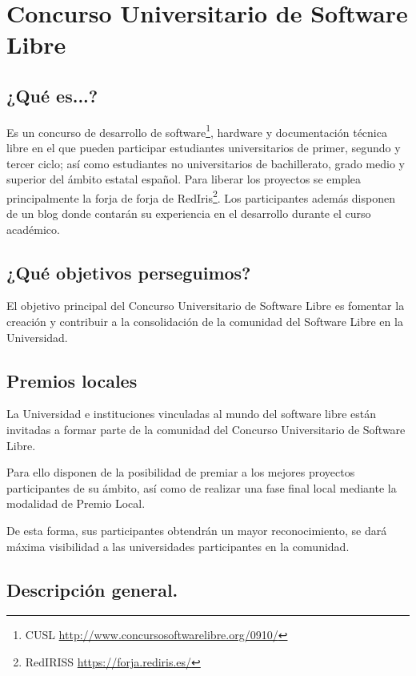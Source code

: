 \chapter*{Concurso Universitario de Software Libre} \label{ap2}

\vspace*{5mm}

\section*{¿Qué es...?}

Es un concurso de desarrollo de software\footnote{CUSL
\url{http://www.concursosoftwarelibre.org/0910/}}, hardware y documentación
técnica libre en el que pueden participar estudiantes universitarios de primer,
segundo y tercer ciclo; así como estudiantes no universitarios de bachillerato,
grado medio y superior del ámbito estatal español. Para liberar los proyectos se
emplea principalmente la forja de forja de RedIris\footnote{RedIRISS
\url{https://forja.rediris.es/}}. Los participantes además
disponen de un blog donde contarán su experiencia en el desarrollo durante el
curso académico.

\section*{¿Qué objetivos perseguimos?}

El objetivo principal del Concurso Universitario de Software Libre es fomentar
la creación y contribuir a la consolidación de la comunidad del Software Libre
en la Universidad.

\section*{Premios locales}

La Universidad e instituciones vinculadas al mundo del software libre están
invitadas a formar parte de la comunidad del Concurso Universitario de Software
Libre.

Para ello disponen de la posibilidad de premiar a los mejores proyectos
participantes de su ámbito, así como de realizar una fase final local mediante
la modalidad de Premio Local.

De esta forma, sus participantes obtendrán un mayor reconocimiento, se dará
máxima visibilidad a las universidades participantes en la comunidad.
\section*{Descripción general.}

